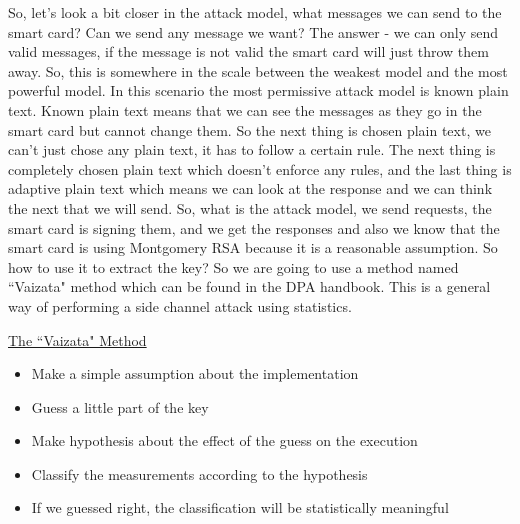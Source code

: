 So, let's look a bit closer in the attack model, what messages we can send to the smart card? Can we send any message we want? The answer - we can only send valid messages, if the message is not valid the smart card will just throw them away. So, this is somewhere in the scale between the weakest model and the most powerful model. In this scenario the most permissive attack model is known plain text. Known plain text means that we can see the messages as they go in the smart card but cannot change them. So the next thing is chosen plain text, we can't  just chose any plain text, it has to follow a certain rule. The next thing is completely chosen plain text which doesn't enforce any rules, and the last thing is adaptive plain text which means we can look at the response and we can think the next that we will send. So, what is the attack model, we send requests, the smart card is signing them, and we get the responses and also we know that the smart card is using Montgomery RSA because it is a reasonable assumption. So how to use it to extract the key? So we are going to use a method named ``Vaizata" method which can be found in the DPA handbook. This is a general way of performing a side channel attack using statistics. \newline

\underline{The ``Vaizata" Method}
\begin{itemize}
	\item Make a simple assumption about the implementation
	\item Guess a little part of the key
	\item Make hypothesis about the effect of the guess on the execution
	\item Classify the measurements according to the hypothesis
	\item If we guessed right, the classification will be statistically meaningful
\end{itemize}


